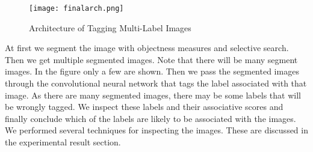 \begin{figure}[h!]
  \centering
  \texttt{[image: finalarch.png]}
  \caption{Architecture of Tagging Multi-Label Images}\label{finalarch}
\end{figure}

At first we segment the image with objectness measures and selective search. Then we get multiple segmented images. Note that there will be many segment images. In the figure only a few are shown. Then we pass the segmented images through the convolutional neural network that tags the label associated with that image. As there are many segmented images, there may be some labels that will be wrongly tagged. We inspect these labels and their associative scores and finally conclude which of the labels are likely to be associated with the images. We performed several techniques for inspecting the images. These are discussed in the experimental result section.

